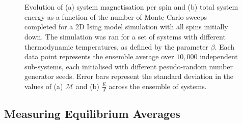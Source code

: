 \documentclass[11pt]{iopart}
\begin{document}
\begin{figure}[t]
  \centering
  \\
    \\
  \caption{Evolution of (a) system magnetisation per spin and (b) total system energy as a function of the number of Monte Carlo sweeps completed for a 2D Ising model simulation with all spins initially down. The simulation was ran for a set of systems with different thermodynamic temperatures, as defined by the parameter $\beta$. Each data point represents the ensemble average over $10,000$ independent sub-systems, each initialised with different pesudo-random number generator seeds. Error bars represent the standard deviation in the values of (a) $\mathcal{M}$ and (b) $\frac{E}{J}$ across the ensemble of systems.}
  \label{fig:convergencegraphs}
\end{figure}

\subsection{Measuring Equilibrium Averages}
\end{document}
